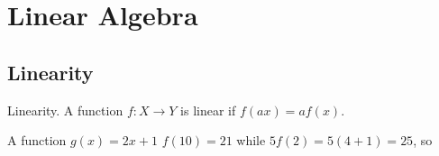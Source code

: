 \section{Linear Algebra}

\subsection{Linearity}

\begin{Def} Linearity.
A function $f:X \to Y$ is linear if $f(a x) = a f(x)$. 
\end{Def}

\begin{Eg}
A function $g(x) = 2x+1$ $f(10)=21$ while $5 f(2) = 5 (4 + 1) = 25$, so
\end{Eg}

